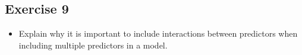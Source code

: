 \documentclass[
]{article}
\providecommand{\tightlist}{%
  \setlength{\itemsep}{0pt}\setlength{\parskip}{0pt}}
\begin{document}
\hypertarget{exercise-9}{%
\subsection{Exercise 9}\label{exercise-9}}

\begin{itemize}
\tightlist
\item
  Explain why it is important to include interactions between predictors
  when including multiple predictors in a model.
\end{itemize}
\end{document}
